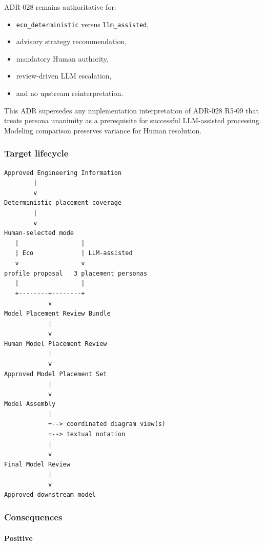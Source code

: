 ADR-028 remains authoritative for:

\begin{itemize}
\tightlist
\item
  \texttt{eco\_deterministic} versus \texttt{llm\_assisted},
\item
  advisory strategy recommendation,
\item
  mandatory Human authority,
\item
  review-driven LLM escalation,
\item
  and no upstream reinterpretation.
\end{itemize}

This ADR supersedes any implementation interpretation of ADR-028 R5-09 that treats persona unanimity as a prerequisite for successful LLM-assisted processing. Modeling comparison preserves variance for Human resolution.

\hypertarget{target-lifecycle-1}{%
\subsubsection{Target lifecycle}\label{target-lifecycle-1}}

\begin{verbatim}
Approved Engineering Information
        |
        v
Deterministic placement coverage
        |
        v
Human-selected mode
   |                 |
   | Eco             | LLM-assisted
   v                 v
profile proposal   3 placement personas
   |                 |
   +--------+--------+
            v
Model Placement Review Bundle
            |
            v
Human Model Placement Review
            |
            v
Approved Model Placement Set
            |
            v
Model Assembly
            |
            +--> coordinated diagram view(s)
            +--> textual notation
            |
            v
Final Model Review
            |
            v
Approved downstream model
\end{verbatim}

\hypertarget{consequences-13}{%
\subsubsection{Consequences}\label{consequences-13}}

\hypertarget{positive-5}{%
\paragraph{Positive}\label{positive-5}}

